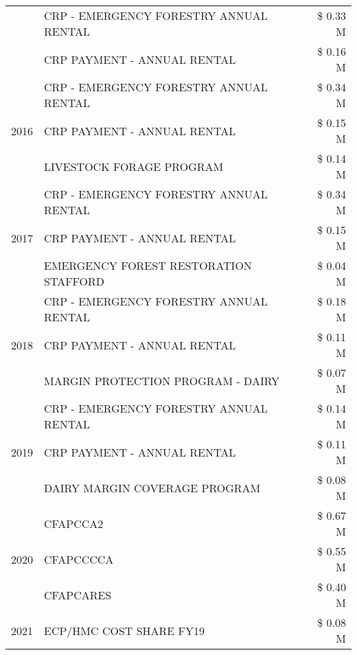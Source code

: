 \begin{tabular}{llr}
 & CRP - EMERGENCY FORESTRY ANNUAL RENTAL & \$ 0.33 M \\
 & CRP PAYMENT - ANNUAL RENTAL & \$ 0.16 M \\
\cline{1-3}
\multirow[t]{3}{*}{2016} & CRP - EMERGENCY FORESTRY ANNUAL RENTAL & \$ 0.34 M \\
 & CRP PAYMENT - ANNUAL RENTAL & \$ 0.15 M \\
 & LIVESTOCK FORAGE PROGRAM & \$ 0.14 M \\
\cline{1-3}
\multirow[t]{3}{*}{2017} & CRP - EMERGENCY FORESTRY ANNUAL RENTAL & \$ 0.34 M \\
 & CRP PAYMENT - ANNUAL RENTAL & \$ 0.15 M \\
 & EMERGENCY FOREST RESTORATION STAFFORD & \$ 0.04 M \\
\cline{1-3}
\multirow[t]{3}{*}{2018} & CRP - EMERGENCY FORESTRY ANNUAL RENTAL & \$ 0.18 M \\
 & CRP PAYMENT - ANNUAL RENTAL & \$ 0.11 M \\
 & MARGIN PROTECTION PROGRAM - DAIRY & \$ 0.07 M \\
\cline{1-3}
\multirow[t]{3}{*}{2019} & CRP - EMERGENCY FORESTRY ANNUAL RENTAL & \$ 0.14 M \\
 & CRP PAYMENT - ANNUAL RENTAL & \$ 0.11 M \\
 & DAIRY MARGIN COVERAGE PROGRAM & \$ 0.08 M \\
\cline{1-3}
\multirow[t]{3}{*}{2020} & CFAPCCA2 & \$ 0.67 M \\
 & CFAPCCCCA & \$ 0.55 M \\
 & CFAPCARES & \$ 0.40 M \\
\cline{1-3}
2021 & ECP/HMC COST SHARE FY19 & \$ 0.08 M \\
\cline{1-3}
\bottomrule
\end{tabular}
